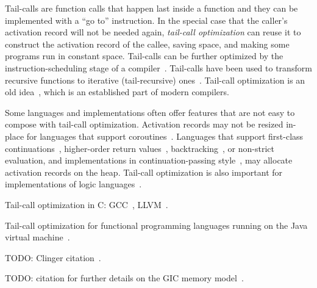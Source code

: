 \documentclass[diploma]{softlab-thesis}
\begin{document}
Tail-calls are function calls that happen last inside a function and
they can be implemented with a ``go to'' instruction. In the special
case that the caller's activation record will not be needed again,
\emph{tail-call optimization} can reuse it to construct the activation
record of the callee, saving space, and making some programs run in
constant space. Tail-calls can be further optimized by the
instruction-scheduling stage of a compiler~\cite[\S12.4.3]{Torczon12}.
Tail-calls have been used to transform recursive functions to
iterative (tail-recursive)
ones~\cite[\S{9}]{McCarthy62}\cite{Barron68}.  Tail-call optimization
is an old idea~\cite[p.~7]{Gill65}\cite[p.~21]{Knuth74}, which is an
established part of modern compilers.

Some languages and implementations often offer features that are not
easy to compose with tail-call optimization. Activation records may
not be resized in-place for languages that support
coroutines~\cite[p.~60]{Waite84}. Languages that support first-class
continuations~\cite{Sperber10}, higher-order return
values~\cite[p.~103]{Appel92}\cite{Steele78},
backtracking~\cite{Bobrow73}, or non-strict evaluation, and
implementations in continuation-passing style~\cite[p.~103]{Appel92},
may allocate activation records on the heap. Tail-call optimization is
also important for implementations of logic languages~\cite{Bigot99}.

Tail-call optimization in C: GCC~\cite{Probst01}, LLVM~\cite{Pandey:2015:LC:2842773}.

Tail-call optimization for functional programming languages running on
the Java virtual machine~\cite{Madsen:2018:TCE:3178372.3179499}.

TODO: Clinger citation~\cite{Clinger:1998:PTR:277650.277719}.

TODO: citation for further details on the GIC memory model~\cite{Fourtounis14}.

\end{document}
